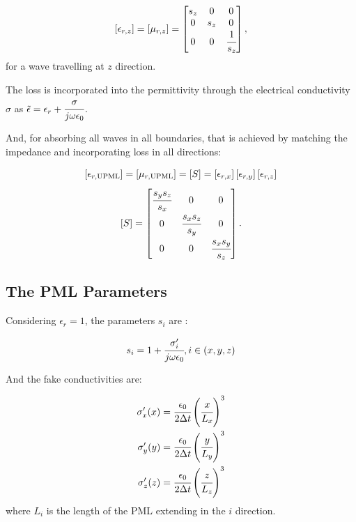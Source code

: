 \begin{equation}
    \brackets{\epsilon_{r,z}} = \brackets{\mu_{r,z}} = \begin{bmatrix}
        s_z & 0 & 0 \\
        0 & s_z & 0 \\
        0 & 0 & \cfrac{1}{s_z}
    \end{bmatrix},
\end{equation}
for a wave travelling at $z$ direction.

The loss is incorporated into the permittivity through the electrical conductivity $\sigma$ as $\tilde{\epsilon} = \epsilon_r + \cfrac{\sigma}{j\omega \epsilon_0}$. 

And, for absorbing all waves in all boundaries, that is achieved by matching the impedance and incorporating loss in all directions:

\begin{equation}
    \brackets{\epsilon_{r,\textnormal{UPML}}} = \brackets{\mu_{r,\textnormal{UPML}}} = \brackets{S} = \brackets{\epsilon_{r,x}}\brackets{\epsilon_{r,y}}\brackets{\epsilon_{r,z}} \nonumber
\end{equation} 
\begin{equation}
    \brackets{S} = \begin{bmatrix}
        \cfrac{s_ys_z}{s_x} & 0 & 0 \\
        0 & \cfrac{s_xs_z}{s_y} & 0 \\
        0 & 0 & \cfrac{s_xs_y}{s_z}
    \end{bmatrix}.
\end{equation}



\subsection{The PML Parameters}

Considering $\epsilon_r = 1$, the parameters $s_i$ are \cite{rumpf_book}:

\begin{align}
    s_i = 1 + \cfrac{\sigma_i^{\prime}}{j\omega\epsilon_0}, i \in (x, y, z)
\end{align}

And the fake conductivities are:

\begin{align}
    \sigma_x\Prime(x) &= \cfrac{\epsilon_0}{2\dt}\pare{\cfrac{x}{L_x}}^3 \\
    \sigma_y\Prime(y) &= \cfrac{\epsilon_0}{2\dt}\pare{\cfrac{y}{L_y}}^3 \\
    \sigma_z\Prime(z) &= \cfrac{\epsilon_0}{2\dt}\pare{\cfrac{z}{L_z}}^3
\end{align}
where $L_i$ is the length of the PML extending in the $i$ direction.


